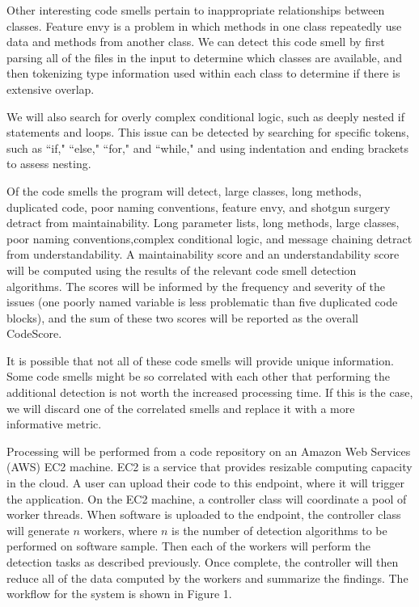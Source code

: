 \documentclass{sig-alternate}
\begin{document}
Other interesting code smells pertain to inappropriate relationships between classes. Feature envy is a problem in which methods in one class repeatedly use data and methods from another class. We can detect this code smell by first parsing all of the files in the input to determine which classes are available, and then tokenizing type information used within each class to determine if there is extensive overlap. 

We will also search for overly complex conditional logic, such as deeply nested if statements and loops. This issue can be detected by searching for specific tokens, such as ``if," ``else," ``for," and ``while," and using indentation and ending brackets to assess nesting.

Of the code smells the program will detect, large classes, long methods, duplicated code, poor naming conventions, feature envy, and shotgun surgery detract from maintainability. Long parameter lists, long methods, large classes, poor naming conventions,complex conditional logic, and message chaining detract from understandability. A maintainability score and an understandability score will be computed using the results of the relevant code smell detection algorithms. The scores will be informed by the frequency and severity of the issues (one poorly named variable is less problematic than five duplicated code blocks), and the sum of these two scores will be reported as the overall CodeScore.

It is possible that not all of these code smells will provide unique information. Some code smells might be so correlated with each other that performing the additional detection is not worth the increased processing time. If this is the case, we will discard one of the correlated smells and replace it with a more informative metric.

Processing will be performed from a code repository on an Amazon Web Services (AWS) EC2 machine. EC2 is a service that provides resizable computing capacity in the cloud. A user can upload their code to this endpoint, where it will trigger the application. On the EC2 machine, a controller class will coordinate a pool of worker threads. When software is uploaded to the endpoint, the controller class will generate $n$ workers, where $n$ is the number of detection algorithms to be performed on software sample. Then each of the workers will perform the detection tasks as described previously. Once complete, the controller will then reduce all of the data computed by the workers and summarize the findings. The workflow for the system is shown in Figure 1. 
\end{document}
